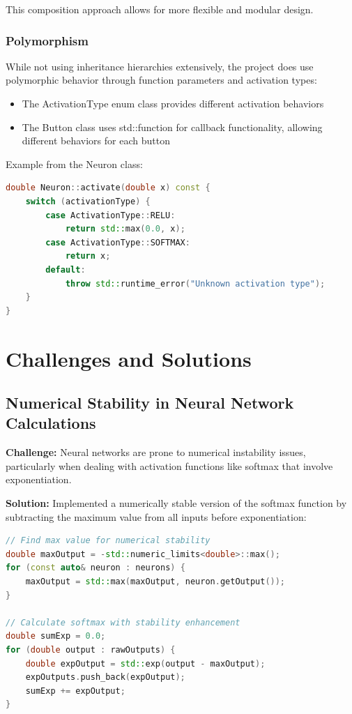 \documentclass[12pt]{article}
\begin{document}
This composition approach allows for more flexible and modular design.

\subsubsection{Polymorphism}

While not using inheritance hierarchies extensively, the project does use polymorphic behavior through function parameters and activation types:

\begin{itemize}
    \item The ActivationType enum class provides different activation behaviors
    \item The Button class uses std::function for callback functionality, allowing different behaviors for each button
\end{itemize}

Example from the Neuron class:
\begin{lstlisting}[language=C++]
double Neuron::activate(double x) const {
    switch (activationType) {
        case ActivationType::RELU:
            return std::max(0.0, x);
        case ActivationType::SOFTMAX:
            return x;
        default:
            throw std::runtime_error("Unknown activation type");
    }
}
\end{lstlisting}

\section{Challenges and Solutions}

\subsection{Numerical Stability in Neural Network Calculations}

\textbf{Challenge:} Neural networks are prone to numerical instability issues, particularly when dealing with activation functions like softmax that involve exponentiation.

\textbf{Solution:} Implemented a numerically stable version of the softmax function by subtracting the maximum value from all inputs before exponentiation:

\begin{lstlisting}[language=C++]
// Find max value for numerical stability
double maxOutput = -std::numeric_limits<double>::max();
for (const auto& neuron : neurons) {
    maxOutput = std::max(maxOutput, neuron.getOutput());
}

// Calculate softmax with stability enhancement
double sumExp = 0.0;
for (double output : rawOutputs) {
    double expOutput = std::exp(output - maxOutput);
    expOutputs.push_back(expOutput);
    sumExp += expOutput;
}
\end{lstlisting}
\end{document}

